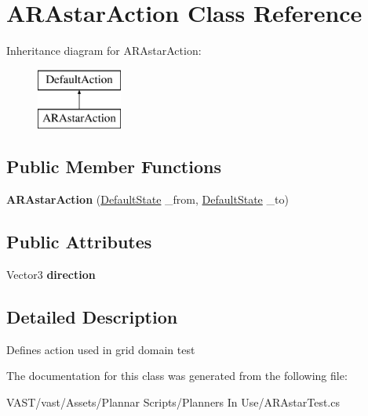 \hypertarget{class_a_r_astar_action}{\section{A\-R\-Astar\-Action Class Reference}
\label{class_a_r_astar_action}
}
Inheritance diagram for A\-R\-Astar\-Action\-:\begin{figure}[H]
\begin{center}
\leavevmode
\includegraphics[height=2.000000cm]{class_a_r_astar_action}
\end{center}
\end{figure}
\subsection*{Public Member Functions}
\begin{DoxyCompactItemize}
\item 
\hypertarget{class_a_r_astar_action_a953c37f988df7b6c603c22e326b8180e}{{\bfseries A\-R\-Astar\-Action} (\hyperlink{class_default_state}{Default\-State} \-\_\-from, \hyperlink{class_default_state}{Default\-State} \-\_\-to)}\label{class_a_r_astar_action_a953c37f988df7b6c603c22e326b8180e}

\end{DoxyCompactItemize}
\subsection*{Public Attributes}
\begin{DoxyCompactItemize}
\item 
\hypertarget{class_a_r_astar_action_a67c203d535ee1b18ddec483a74b5923e}{Vector3 {\bfseries direction}}\label{class_a_r_astar_action_a67c203d535ee1b18ddec483a74b5923e}

\end{DoxyCompactItemize}


\subsection{Detailed Description}
Defines action used in grid domain test 

The documentation for this class was generated from the following file\-:\begin{DoxyCompactItemize}
\item 
V\-A\-S\-T/vast/\-Assets/\-Plannar Scripts/\-Planners In Use/A\-R\-Astar\-Test.\-cs\end{DoxyCompactItemize}
